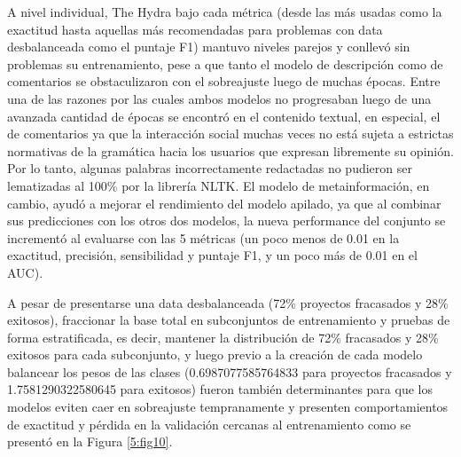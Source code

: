 A nivel individual, The Hydra bajo cada métrica (desde las más usadas como la exactitud hasta aquellas más recomendadas para problemas con data desbalanceada como el puntaje F1) mantuvo niveles parejos y conllevó sin problemas su entrenamiento, pese a que tanto el modelo de descripción como de comentarios se obstaculizaron con el sobreajuste luego de muchas épocas. Entre una de las razones por las cuales ambos modelos no progresaban luego de una avanzada cantidad de épocas se encontró en el contenido textual, en especial, el de comentarios ya que la interacción social muchas veces no está sujeta a estrictas normativas de la gramática hacia los usuarios que expresan libremente su opinión. Por lo tanto, algunas palabras incorrectamente redactadas no pudieron ser lematizadas al 100\% por la librería NLTK. El modelo de metainformación, en cambio, ayudó a mejorar el rendimiento del modelo apilado, ya que al combinar sus predicciones con los otros dos modelos, la nueva performance del conjunto se incrementó al evaluarse con las 5 métricas (un poco menos de 0.01 en la exactitud, precisión, sensibilidad y puntaje F1, y un poco más de 0.01 en el AUC).

A pesar de presentarse una data desbalanceada (72\% proyectos fracasados y 28\% exitosos), fraccionar la base total en subconjuntos de entrenamiento y pruebas de forma estratificada, es decir, mantener la distribución de 72\% fracasados y 28\% exitosos para cada subconjunto, y luego previo a la creación de cada modelo balancear los pesos de las clases (0.6987077585764833 para proyectos fracasados y 1.7581290322580645 para exitosos) fueron también determinantes para que los modelos eviten caer en sobreajuste tempranamente y presenten comportamientos de exactitud y pérdida en la validación cercanas al entrenamiento como se presentó en la Figura \ref{5:fig10}.

